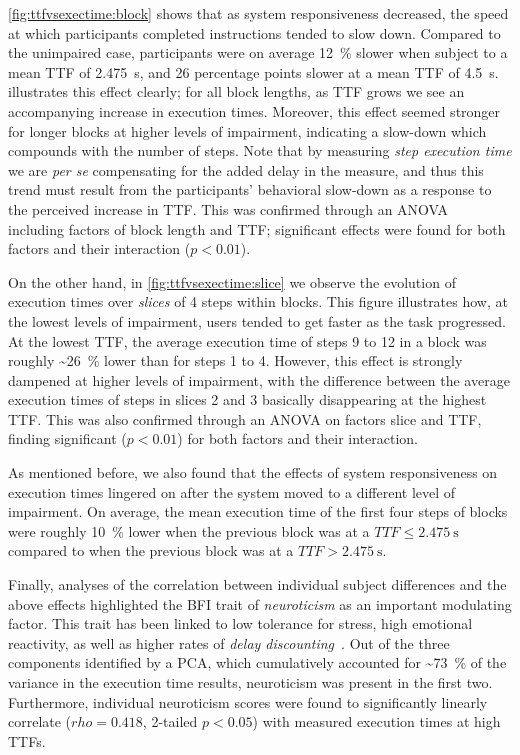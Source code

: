 \cref{fig:ttfvsexectime:block} shows that as system responsiveness decreased, the speed at which participants completed instructions tended to slow down.
Compared to the unimpaired case, participants were on average \SI{12}{\percent} slower when subject to a mean \gls{TTF} of \SI{2.475}{\second}, and \num{26} percentage points slower at a mean \gls{TTF} of \SI{4.5}{\second}.
 illustrates this effect clearly;
for all block lengths, as \gls{TTF} grows we see an accompanying increase in execution times.
Moreover, this effect seemed stronger for longer blocks at higher levels of impairment, indicating a slow-down which compounds with the number of steps.
Note that by measuring \emph{step execution time} we are \emph{per se} compensating for the added delay in the measure, and thus this trend must result from the participants' behavioral slow-down as a response to the perceived increase in \gls{TTF}.
This was confirmed through an \gls{ANOVA}~\cite{fujikoshi1993two} including factors of block length and \gls{TTF}; significant effects were found for both factors and their interaction (\ensuremath{p < 0.01}).

On the other hand, in \cref{fig:ttfvsexectime:slice} we observe the evolution of execution times over \emph{slices} of \num{4} steps within blocks.
This figure illustrates how, at the lowest levels of impairment, users tended to get faster as the task progressed.
At the lowest \gls{TTF}, the average execution time of steps \num{9} to \num{12} in a block was roughly \textasciitilde\SI{26}{\percent} lower than for steps \num{1} to \num{4}.
However, this effect is strongly dampened at higher levels of impairment, with the difference between the average execution times of steps in slices \num{2} and \num{3} basically disappearing at the highest \gls{TTF}.
This was also confirmed through an \gls{ANOVA} on factors slice and \gls{TTF}, finding significant (\ensuremath{p < 0.01}) for both factors and their interaction.

As mentioned before, we also found that the effects of system responsiveness on execution times lingered on after the system moved to a different level of impairment.
On average, the mean execution time of the first four steps of blocks were roughly \SI{10}{\percent} lower when the previous block was at a \ensuremath{TTF \leq \SI{2.475}{\second}} compared to when the previous block was at a \ensuremath{TTF > \SI{2.475}{\second}}.

Finally, analyses of the correlation between individual subject differences and the above effects highlighted the \gls{BFI} trait of \emph{neuroticism} as an important modulating factor.
This trait has been linked to low tolerance for stress, high emotional reactivity, as well as higher rates of \emph{delay discounting}~\cite{hirsh2008delay}.
Out of the three components identified by a \gls{PCA}, which cumulatively accounted for \textasciitilde\SI{73}{\percent} of the variance in the execution time results, neuroticism was present in the first two.
Furthermore, individual neuroticism scores were found to significantly linearly correlate (\ensuremath{rho = 0.418}, \num{2}-tailed \ensuremath{p < 0.05}) with measured execution times at high \glspl{TTF}.
